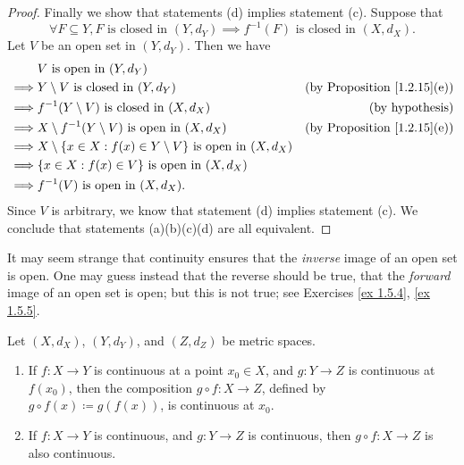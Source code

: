 \begin{proof}
    Finally we show that statements (d) implies statement (c).
    Suppose that
    \[
        \forall F \subseteq Y, F \text{ is closed in } (Y, d_Y) \implies f^{-1}(F) \text{ is closed in } (X, d_X).
    \]
    Let \(V\) be an open set in \((Y, d_Y)\).
    Then we have
    \begin{align*}
                 & V \text{ is open in } (Y, d_Y)                                                                                          \\
        \implies & Y \setminus V \text{ is closed in } (Y, d_Y)                                  & \text{(by Proposition \ref{1.2.15}(e))} \\
        \implies & f^{-1}(Y \setminus V) \text{ is closed in } (X, d_X)                          & \text{(by hypothesis)}                  \\
        \implies & X \setminus f^{-1}(Y \setminus V) \text{ is open in } (X, d_X)                & \text{(by Proposition \ref{1.2.15}(e))} \\
        \implies & X \setminus \{x \in X : f(x) \in Y \setminus V\} \text{ is open in } (X, d_X)                                           \\
        \implies & \{x \in X : f(x) \in V\} \text{ is open in } (X, d_X)                                                                   \\
        \implies & f^{-1}(V) \text{ is open in } (X, d_X).
    \end{align*}
    Since \(V\) is arbitrary, we know that statement (d) implies statement (c).
    We conclude that statements (a)(b)(c)(d) are all equivalent.
\end{proof}

\begin{remark}\label{2.1.6}
    It may seem strange that continuity ensures that the \emph{inverse} image of an open set is open.
    One may guess instead that the reverse should be true, that the \emph{forward} image of an open set is open;
    but this is not true;
    see Exercises \ref{ex 1.5.4}, \ref{ex 1.5.5}.
\end{remark}

\begin{corollary}\label{2.1.7}
    Let \((X, d_X)\), \((Y, d_Y)\), and \((Z, d_Z)\) be metric spaces.
    \begin{enumerate}
        \item If \(f : X \to Y\) is continuous at a point \(x_0 \in X\), and \(g : Y \to Z\) is continuous at \(f(x_0)\), then the composition \(g \circ f : X \to Z\), defined by \(g \circ f(x) \coloneqq g(f(x))\), is continuous at \(x_0\).
        \item If \(f : X \to Y\) is continuous, and \(g : Y \to Z\) is continuous, then \(g \circ f : X \to Z\) is also continuous.
    \end{enumerate}
\end{corollary}

